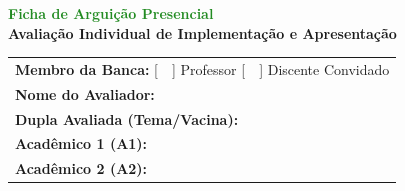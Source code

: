 \documentclass[12pt,a4paper]{article}
\begin{document}
\begin{center}
    {\huge \textbf{\textcolor{forestgreen}{Ficha de Arguição Presencial}}} \\[0.3cm]
    {\large \textbf{Avaliação Individual de Implementação e Apresentação}} \\[0.8cm]
\end{center}

\begin{tcolorbox}[colback=white, colframe=forestgreen, title=\textbf{Identificação da Avaliação}, fonttitle=\bfseries]
    \renewcommand{\arraystretch}{1.5}
    \begin{tabular}{p{}}
         \textbf{Membro da Banca:} [~~] Professor \hspace{1cm} [~~] Discente Convidado \\
         \textbf{Nome do Avaliador:} \underline{\hspace{10cm}} \\
         \textbf{Dupla Avaliada (Tema/Vacina):} \underline{\hspace{8.5cm}} \\
         \textbf{Acadêmico 1 (A1):} \underline{\hspace{12cm}} \\
         \textbf{Acadêmico 2 (A2):} \underline{\hspace{12cm}} \\
    \end{tabular}
\end{tcolorbox}

\vspace{0.8cm}
\end{document}
